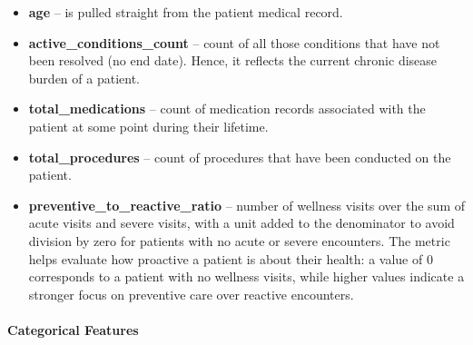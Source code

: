 \begin{itemize}

    \item \textbf{age} -- is pulled straight from the patient medical record.

    \item \textbf{active\_conditions\_count} -- count of all those conditions that have not been resolved (no end date). Hence, it reflects the current chronic disease burden of a patient.

    \item \textbf{total\_medications} -- count of medication records associated with the patient at some point during their lifetime.

    \item \textbf{total\_procedures} -- count of procedures that have been conducted on the patient.

    \item \textbf{preventive\_to\_reactive\_ratio} -- number of wellness visits over the sum of acute visits and severe visits, with a unit added to the denominator to avoid division by zero for patients with no acute or severe encounters. The metric helps evaluate how proactive a patient is about their health: a value of 0 corresponds to a patient with no wellness visits, while higher values indicate a stronger focus on preventive care over reactive encounters.

\end{itemize}



\paragraph{Categorical Features}

